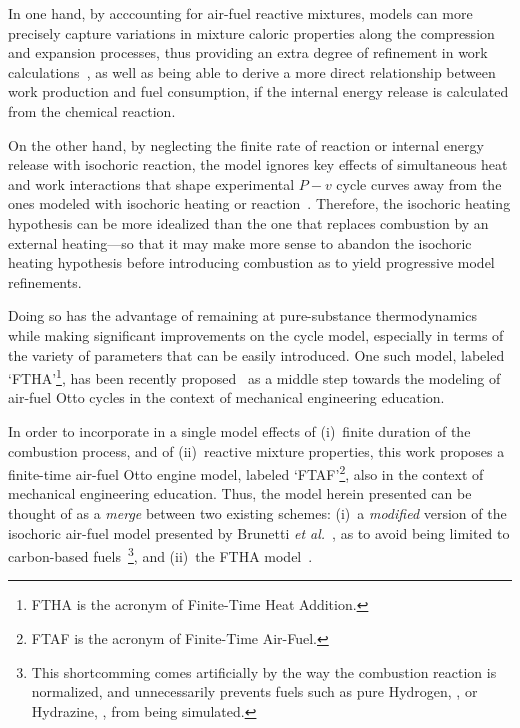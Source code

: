     In one hand, by acccounting for air-fuel reactive mixtures, models can more precisely capture variations in mixture caloric properties along the compression and expansion  processes,  thus
    providing an extra degree of refinement in work calculations~\cite{2012-BrunettiF-Blucher}, as well as being able to derive a more direct relationship  between  work  production  and  fuel
    consumption, if the internal energy release is calculated from the chemical reaction.

    On the other hand, by neglecting the finite rate of reaction or internal energy release with isochoric reaction, the model ignores key effects of simultaneous heat  and  work  interactions
    that shape experimental $P-v$ cycle curves away from the ones modeled with isochoric heating or reaction~\cite{2013-MartinsJJG-Publindustria}. Therefore, the isochoric  heating  hypothesis
    can be more idealized than the one that replaces combustion by an external heating---so that it may make  more  sense  to  abandon  the  isochoric  heating  hypothesis  before  introducing
    combustion as to yield progressive model refinements.

    Doing so has the advantage of remaining at pure-substance thermodynamics while making significant improvements on the cycle model, especially in terms of the variety of parameters that can
    be easily introduced. One such model, labeled `FTHA'\footnote{FTHA is the acronym of Finite-Time Heat Addition.}, has been recently proposed~\cite{2017-NaaktgeborenC-IntJMechEngEduc} as  a
    middle step towards the modeling of air-fuel Otto cycles in the context of mechanical engineering education.

    In order to incorporate in a single model effects of (i)~finite duration of the combustion process, and of (ii)~reactive mixture properties, this work proposes a finite-time air-fuel  Otto
    engine model, labeled `FTAF'\footnote{FTAF is the acronym of Finite-Time Air-Fuel.}, also in the context of mechanical engineering education.  Thus,  the  model  herein  presented  can  be
    thought  of  as  a   \emph{merge}   between   two   existing   schemes:   (i)~a   \emph{modified}   version   of   the   isochoric   air-fuel   model   presented   by   Brunetti   \emph{et
    al.\/}~\cite{2012-BrunettiF-Blucher}, as to avoid being limited to carbon-based fuels~\footnote{This shortcomming comes artificially by the way the combustion reaction is  normalized,  and
    unnecessarily prevents fuels such as pure Hydrogen, , or Hydrazine, , from being simulated.}, and (ii)~the FTHA model~\cite{2017-NaaktgeborenC-IntJMechEngEduc}.

